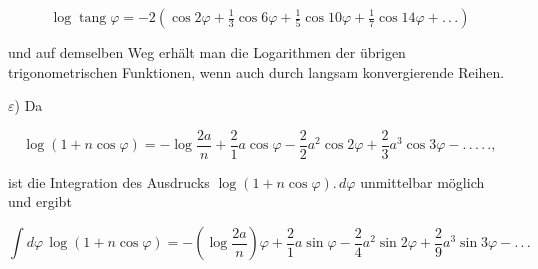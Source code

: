 \[
\log\operatorname{tang}\varphi = -2\left(\cos2\varphi + \tfrac{1}{3}\cos6\varphi + \tfrac{1}{5}\cos10\varphi + \tfrac{1}{7}\cos14\varphi + .\,.\,.\right)
\]

\noindent und auf demselben Weg erhält man die Logarithmen der übrigen trigonometrischen Funktionen, wenn auch durch
langsam konvergierende Reihen.

$\varepsilon$) Da

\[
\log(1+n\cos\varphi) = -\log\frac{2a}{n} + \frac{2}{1}a\cos\varphi - \frac{2}{2}a^2\cos2\varphi + \frac{2}{3}a^3\cos3\varphi - .\,.\,.\,.\,.,
\]

\noindent ist die Integration des Ausdrucks $\log(1+n\cos\varphi).\,d\varphi$ unmittelbar möglich und ergibt

\[
\int d\varphi\,\log(1+n\cos\varphi) = -\left(\log\frac{2a}{n}\right)\varphi + \frac{2}{1}a\sin\varphi - \frac{2}{4}a^2\sin2\varphi + \frac{2}{9}a^3\sin3\varphi - .\,.\,. 
\]

